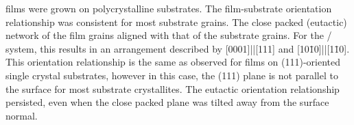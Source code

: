  films were grown on polycrystalline  substrates. The film-substrate
orientation relationship was consistent for most substrate grains. The close packed
(eutactic) network of the film grains aligned with that of the substrate grains. For the
/ system, this results in an arrangement described by
[0001]||[111] and [10\={1}0]||[1\={1}0]. This
orientation relationship is the same as observed for films on (111)-oriented single
crystal substrates, however in this case, the (111) plane is not parallel to the surface
for most substrate crystallites. The eutactic orientation relationship persisted, even
when the close packed plane was tilted away from the surface normal.

